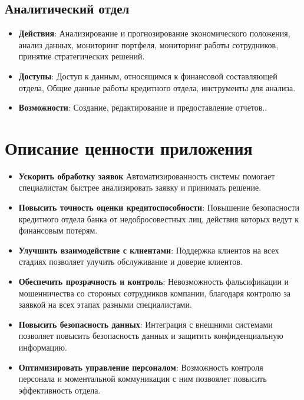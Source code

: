 \documentclass[20pt]{article}
\begin{document}
\subsection{Аналитический отдел}
\begin{itemize}
    \item \textbf{Действия}: Анализирование и прогнозирование экономического положения, анализ данных, мониторинг портфеля, мониторинг работы сотрудников, принятие стратегических решений.
    \item \textbf{Доступы}: Доступ к данным, относящимся к финансовой составляющей отдела, Общие данные работы кредитного отдела, инструменты для анализа.
    \item \textbf{Возможности}: Создание, редактирование и предоставление отчетов..
\end{itemize}



\section{Описание ценности приложения}

\begin{itemize}
    \item \textbf{Ускорить обработку заявок} Автоматизированность системы помогает специалистам быстрее анализировать заявку и принимать решение.
    \item \textbf{Повысить точность оценки кредитоспособности}: Повышение безопасности кредитного отдела банка от недобросовестных лиц, действия которых ведут к финансовым потерям.
    \item \textbf{Улучшить взаимодействие с клиентами}: Поддержка клиентов на всех стадиях позволяет улучить обслуживание и доверие клиентов.
    \item \textbf{Обеспечить прозрачность и контроль}: Невозможность фальсификации и мошенничества со стороных сотрудников компании, благодаря контролю за заявкой на всех этапах разными специалистами.
    \item \textbf{Повысить безопасность данных}: Интеграция с внешними системами позволяет повысить безопасность данных и защитить конфиденциальную информацию.
    \item \textbf{Оптимизировать управление персоналом}: Возможность контроля персонала и моментальной коммуникации с ним позвоялет повысить эффективность отдела.
\end{itemize}


\end{document}
